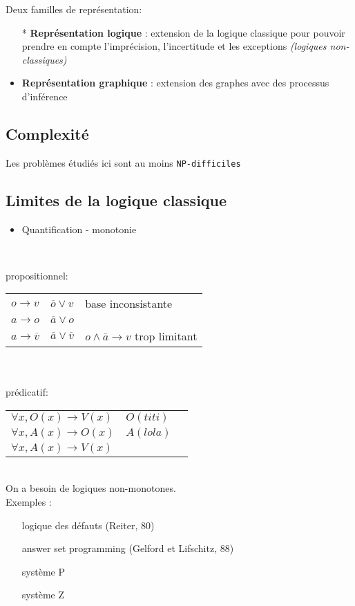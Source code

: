 \documentclass[a4paper,12pt]{article}
\begin{document}
	Deux familles de représentation:
	\begin{itemize}
		\item[*] \textbf{Représentation logique} : extension de la logique classique pour pouvoir prendre en compte l'imprécision, l'incertitude et les exceptions \emph{(logiques non-classiques)}
		\item \textbf{Représentation graphique} : extension des graphes avec des processus d'inférence
	\end{itemize}
	
	\subsection{Complexité}
	Les problèmes étudiés ici sont au moins \texttt{NP-difficiles}
	
	\subsection{Limites de la logique classique}
	\begin{itemize}
		\item Quantification - monotonie
	\end{itemize}
	~
	
	\noindent propositionnel:\\
	\begin{tabular}{lll}
		$o \rightarrow v$ & $\overline{o} \lor v $  & base inconsistante\\
		$a \rightarrow o$ & $\overline{a} \lor o $ & \\
		$a \rightarrow \overline{v}$  & $\overline{a} \lor \overline{v} $ & $o \land \overline{a} \rightarrow v$ trop limitant
	\end{tabular}
	~\\~\\
	
	\noindent prédicatif:\\
	\begin{tabular}{lll}
		$\forall x, O(x) \rightarrow V(x)$ & $O(titi) $  & \\
		$\forall x, A(x) \rightarrow O(x)$ & $A(lola) $ & \\
		$\forall x, A(x) \rightarrow V(x)$  &  &
	\end{tabular}
	~\\
	
	On a besoin de logiques non-monotones.\\
	
	Exemples :
	\begin{itemize}
		\item[] logique des défauts (Reiter, 80)
		\item[] answer set programming (Gelford et Lifschitz, 88)
		\item[] système P
		\item[] système Z
	\end{itemize}
	~\\
	
\end{document}
